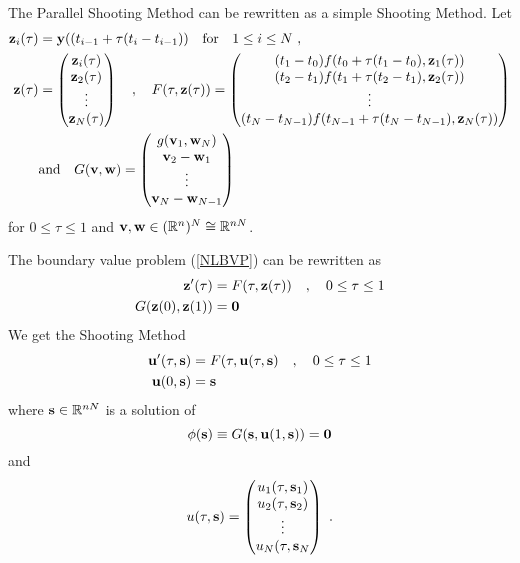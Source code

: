 The Parallel Shooting Method can be rewritten as a simple Shooting
Method.  Let
\begin{align*}
\mathbf{z}_i(\tau) &= \mathbf{y}((t_{i-1} + \tau (t_i - t_{i-1})) \quad
\text{for} \quad 1 \leq i \leq N \ , \\ 
\mathbf{z}(\tau) &= \begin{pmatrix}
\mathbf{z}_i(\tau) \\ \mathbf{z}_2(\tau) \\ \vdots \\ \mathbf{z}_N(\tau)
\end{pmatrix} \quad , \quad
F(\tau,\mathbf{z}(\tau)) = \begin{pmatrix}
(t_1 - t_0 ) f(t_0+\tau (t_1-t_0),\mathbf{z}_1(\tau)) \\
(t_2 - t_1 ) f(t_1+\tau (t_2-t_1),\mathbf{z}_2(\tau)) \\
\vdots \\
(t_N - t_{N-1} ) f(t_{N-1}+\tau (t_N-t_{N-1}),\mathbf{z}_N(\tau))
\end{pmatrix} \\
& \text{and}  \quad G(\mathbf{v},\mathbf{w}) = \begin{pmatrix}
g(\mathbf{v}_1,\mathbf{w}_N) \\
\mathbf{v}_2 - \mathbf{w}_1 \\
\vdots \\
\mathbf{v}_N - \mathbf{w}_{N-1}
\end{pmatrix}
\end{align*}
for $0 \leq \tau \leq 1$ and
$\mathbf{v}, \mathbf{w} \in (\mathbb{R}^n)^N \cong \mathbb{R}^{nN}$.

The boundary value problem (\ref{NLBVP}) can be rewritten as
\begin{equation}\label{NLBVPinnN}
\begin{split}
\mathbf{z}'(\tau) &= F(\tau,\mathbf{z}(\tau)) \quad , \quad 0 \leq \tau
\leq 1 \\
G(\mathbf{z}(0), \mathbf{z}(1)) &= \mathbf{0}
\end{split}
\end{equation}
We get the Shooting Method
\begin{equation} \label{LargeShoot}
\begin{split}
\mathbf{u}'(\tau,\mathbf{s}) &= F(\tau,\mathbf{u}(\tau,\mathbf{s}) \quad ,
\quad 0 \leq \tau \leq 1 \\
\mathbf{u}(0,\mathbf{s}) &= \mathbf{s}
\end{split}
\end{equation}
where $\mathbf{s} \in \mathbb{R}^{nN}$ is a solution of
\begin{equation} \label{LargeIter}
\phi(\mathbf{s}) \equiv G(\mathbf{s},\mathbf{u}(1,\mathbf{s})) = \mathbf{0}
\end{equation}
and
\[
u(\tau,\mathbf{s}) = \begin{pmatrix}
u_1(\tau,\mathbf{s}_1) \\
u_2(\tau,\mathbf{s}_2) \\
\vdots \\
u_N(\tau,\mathbf{s}_N
\end{pmatrix} \ .
\]


